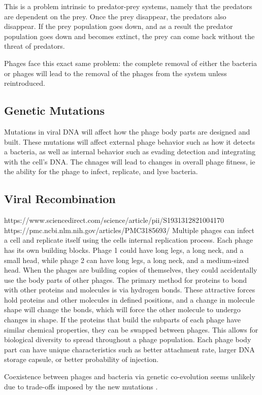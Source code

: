 This is a problem intrinsic to predator-prey systems, namely that the predators are dependent on the prey. 
Once the prey disappear, the predators also disappear. 
If the prey population goes down, and as a result the predator population goes down and becomes extinct, the prey can come back without the threat of predators. 

Phages face this exact same problem: the complete removal of either the bacteria or phages will lead to the removal of the phages from the system unless reintroduced. 

\subsection{Genetic Mutations}
Mutations in viral DNA will affect how the phage body parts are designed and built. 
These mutations will affect external phage behavior such as how it detects a bacteria, as well as internal behavior such as evading detection and integrating with the cell's DNA. 
The chnages will lead to changes in overall phage fitness, ie the ability for the phage to infect, replicate, and lyse bacteria. 

\subsection{Viral Recombination}
https://www.sciencedirect.com/science/article/pii/S1931312821004170
https://pmc.ncbi.nlm.nih.gov/articles/PMC3185693/
Multiple phages can infect a cell and replicate itself using the cells internal replication process. 
Each phage has its own building blocks. 
Phage 1 could have long legs, a long neck, and a small head, while phage 2 can have long legs, a long neck, and a medium-sized head. 
When the phages are building copies of themselves, they could accidentally use the body parts of other phages. 
The primary method for proteins to bond with other proteins and molecules is via hydrogen bonds. 
These attractive forces hold proteins and other molecules in defined positions, and a change in molecule shape will change the bonds, which will force the other molecule to undergo changes in shape. 
If the proteins that build the subparts of each phage have similar chemical properties, they can be swapped between phages. 
This allows for biological diversity to spread throughout a phage population. 
Each phage body part can have unique characteristics such as better attachment rate, larger DNA storage capsule, or better probability of injection. 

Coexistence between phages and bacteria via genetic co-evolution seems unlikely due to trade-offs imposed by the new mutations \cite{bullOptimalityModelsPhage2006}. 



